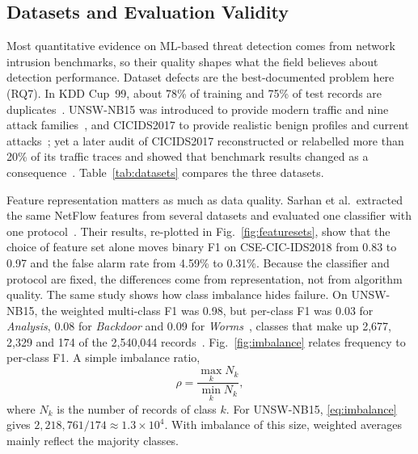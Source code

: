 \documentclass[conference]{IEEEtran}
\begin{document}
\subsection{Datasets and Evaluation Validity}
Most quantitative evidence on ML-based threat detection comes from network intrusion benchmarks, so their quality shapes what the field believes about detection performance. Dataset defects are the best-documented problem here (RQ7). In KDD Cup~99, about 78\% of training and 75\% of test records are duplicates~\cite{tavallaee2009detailed}. UNSW-NB15 was introduced to provide modern traffic and nine attack families~\cite{moustafa2015unsw}, and CICIDS2017 to provide realistic benign profiles and current attacks~\cite{sharafaldin2018toward}; yet a later audit of CICIDS2017 reconstructed or relabelled more than 20\% of its traffic traces and showed that benchmark results changed as a consequence~\cite{engelen2021troubleshooting}. Table~\ref{tab:datasets} compares the three datasets.

Feature representation matters as much as data quality. Sarhan et al.\ extracted the same NetFlow features from several datasets and evaluated one classifier with one protocol~\cite{sarhan2022standard}. Their results, re-plotted in Fig.~\ref{fig:featuresets}, show that the choice of feature set alone moves binary F1 on CSE-CIC-IDS2018 from 0.83 to 0.97 and the false alarm rate from 4.59\% to 0.31\%. Because the classifier and protocol are fixed, the differences come from representation, not from algorithm quality. The same study shows how class imbalance hides failure. On UNSW-NB15, the weighted multi-class F1 was 0.98, but per-class F1 was 0.03 for \textit{Analysis}, 0.08 for \textit{Backdoor} and 0.09 for \textit{Worms}~\cite{sarhan2022standard}, classes that make up 2,677, 2,329 and 174 of the 2,540,044 records~\cite{moustafa2015unsw}. Fig.~\ref{fig:imbalance} relates frequency to per-class F1. A simple imbalance ratio,
\begin{equation}
\rho=\frac{\max_k N_k}{\min_k N_k},
\label{eq:imbalance}
\end{equation}
where $N_k$ is the number of records of class $k$. For UNSW-NB15, \eqref{eq:imbalance} gives $2{,}218{,}761/174\approx1.3\times10^4$. With imbalance of this size, weighted averages mainly reflect the majority classes.
\end{document}
